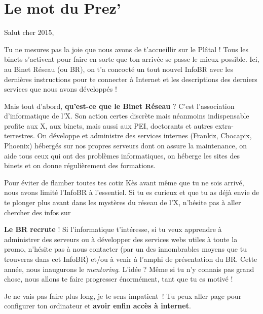 \thispagestyle{empty}

\section*{Le mot du Prez'}

\vspace{1em}

Salut cher 2015,
\vspace{0.5em}

Tu ne mesures pas la joie que nous avons de t'accueillir sur le Plâtal ! Tous les binets s'activent pour faire en sorte que ton arrivée se passe le mieux possible. Ici, au Binet Réseau (ou BR), on t'a concocté un tout nouvel InfoBR avec les dernières instructions pour te connecter à Internet et les descriptions des derniers services que nous avons développés !

Mais tout d'abord, \textbf{qu'est-ce que le Binet Réseau} ? C'est l'association d'informatique de l'X. Son action certes discrète mais néanmoins indispensable profite aux X, aux binets, mais aussi aux PEI, doctorants et autres extra-terrestres. On développe et administre des services internes (Frankiz, Chocapix, Phoenix) hébergés sur nos propres serveurs dont on assure la maintenance, on aide tous ceux qui ont des problèmes informatiques, on héberge les sites des binets et on donne régulièrement des formations.

Pour éviter de flamber toutes tes cotiz Kès avant même que tu ne sois arrivé, nous avons limité l’InfoBR à l’essentiel. Si tu es curieux et que tu as déjà envie de te plonger plus avant dans les mystères du réseau de l’X, n’hésite pas à aller chercher des infos sur 

\vspace{1em}
\textbf{Le BR recrute} ! Si l'informatique t'intéresse, si tu veux apprendre à administrer des serveurs ou à développer des services webs utiles à toute la promo, n'hésite pas à nous contacter (par un des innombrables moyens que tu trouveras dans cet InfoBR) et/ou à venir à l'amphi de présentation du BR. Cette année, nous inaugurons le \emph{mentoring}. L'idée ? Même si tu n'y connais pas grand chose, nous allons te faire progresser énormément, tant que tu es motivé !

\vspace{1em}
Je ne vais pas faire plus long, je te sens impatient~! Tu peux aller page \pageref{config} pour configurer ton ordinateur et \textbf{avoir enfin accès à internet}.

